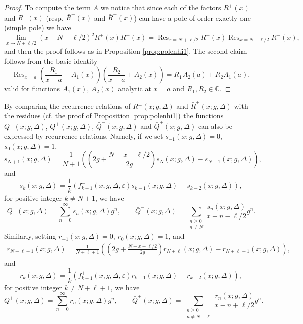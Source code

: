 \documentclass[11pt]{article}
\numberwithin{equation}{section}
\newcommand{\C}{\mathbb{C}} %
\newcommand{\e}{\varepsilon}
\DeclareMathOperator*{\Res}{Res} %
\theoremstyle{plain}
\theoremstyle{definition}
\theoremstyle{remark}
\begin{document}
\begin{proof}
  To compute the term \(A\) we notice that since each of the factors \(R^+(x)\) and \(R^-(x) \) (resp. \(\bar{R}^+(x)\) and \(\bar{R}^-(x) \))
  can have a pole of order exactly one (simple pole) we have
  \[
     \lim_{x \to N+\ell/2} (x- N - \ell/2)^2 R^+(x) R^{-}(x)  = \Res_{x= N+\ell/2} R^+(x) \Res_{x= N+\ell/2} R^-(x),
  \]
  and then the proof follows as in Proposition \ref{prop:polenhi1}. The second claim follows from the basic identity
  \[
    \Res_{x=a} \left(\frac{R_1}{x-a} + A_1(x)\right) \left(\frac{R_2}{x-a} + A_2(x)\right) = R_1 A_2(a) + R_2 A_1(a),
  \]
  valid for functions $A_1(x)$, $A_2(x)$ analytic at \(x=a\) and \(R_1,R_2 \in \C \). 
\end{proof}

By comparing the recurrence relations of $R^{\pm}(x;g,\Delta)$ and $\bar{R}^{\pm}(x;g,\Delta)$ with the residues (cf. the proof of Proposition \ref{prop:polenhi1}) the functions \(Q^{-}(x;g,\Delta) \), \(Q^{+}(x;g,\Delta) \), \(\bar{Q}^{-}(x;g,\Delta) \) and \(\bar{Q}^{+}(x;g,\Delta) \) can also
be expressed by recurrence relations. Namely, if we set \(s_{-1}(x;g,\Delta)= 0\), \(s_{0}(x;g,\Delta)=1 \),
\[
  s_{N+1}(x;g,\Delta) = \frac{1}{N+1}\left(\left(2g + \frac{N-x-\ell/2}{2g} \right) s_{N}(x;g,\Delta) - s_{N-1}(x;g,\Delta) \right),
\]
and
\[
  s_k(x;g,\Delta) = \frac{1}{k}\left( f_{k-1}^-(x,g,\Delta,\e) s_{k-1}(x;g,\Delta) - s_{k-2} (x;g,\Delta) \right),
\]
for positive integer \(k \neq N+1 \), we have
\begin{equation}
  \label{eq:qfunctdef-}
  Q^-(x;g,\Delta) = \sum_{n=0}^{\infty} s_n(x;g,\Delta) g^n, \qquad
  \bar{Q}^-(x;g,\Delta) = \sum_{\substack{n\ge 0 \\ n\ne N}} \frac{s_n(x;g,\Delta)}{x-n-\ell/2} g^n.
\end{equation}
Similarly, setting \(r_{-1}(x;g,\Delta)= 0\), \(r_{0}(x;g,\Delta)=1 \), and
\begin{align*}
  r_{N+\ell+1}(x;g,\Delta) = \frac{1}{N+\ell+1} \left(\left(2g + \frac{N-x+\ell/2}{2g} \right) r_{N+\ell}(x;g,\Delta) - r_{N+\ell-1}(x;g,\Delta) \right), 
\end{align*}
and
\[
  r_k(x;g,\Delta) = \frac{1}{k}\left( f_{k-1}^+(x,g,\Delta,\e) r_{k-1}(x;g,\Delta) - r_{k-2} (x;g,\Delta) \right),
\]
for positive integer \(k \ne N+\ell+ 1\), we have
\begin{equation}
  \label{eq:qfunctdef+}
  Q^+(x;g,\Delta) = \sum_{n=0}^{\infty} r_n(x;g,\Delta) g^n, \qquad
  \bar{Q}^+(x;g,\Delta) = \sum_{\substack{n\ge 0 \\ n\ne N+\ell}} \frac{r_n(x;g,\Delta)}{x-n+\ell/2} g^n.
\end{equation}
\end{document}
